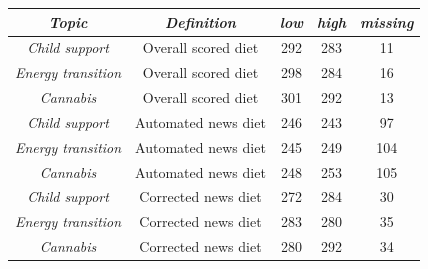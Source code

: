 \begin{tabular}{c c c c c}
      \hline
      \textit{Topic} & \textit{Definition} & \textit{low} & \textit{high} & \textit{missing} \\
      \hline
      \textit{Child support} & Overall scored diet & 292 & 283 & 11 \\
      \textit{Energy transition} & Overall scored diet & 298 & 284 & 16 \\
      \textit{Cannabis} & Overall scored diet & 301 & 292 & 13 \\
      \textit{Child support} & Automated news diet & 246 & 243 & 97 \\
      \textit{Energy transition} & Automated news diet & 245 & 249 & 104 \\
      \textit{Cannabis} & Automated news diet & 248 & 253 & 105 \\
      \textit{Child support} & Corrected news diet & 272 & 284 & 30 \\
      \textit{Energy transition} & Corrected news diet & 283 & 280 & 35 \\
      \textit{Cannabis} & Corrected news diet & 280 & 292 & 34 \\
      \hline
    \end{tabular}
